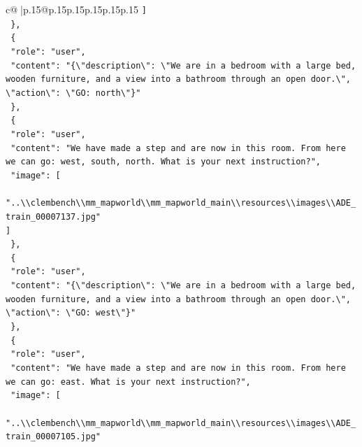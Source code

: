 \documentclass{article}
\begin{document}
{\begin{supertabular}{c@{$\;$}|p{.15\linewidth}@{}p{.15\linewidth}p{.15\linewidth}p{.15\linewidth}p{.15\linewidth}p{.15\linewidth}}
{{{\texttt{    {]}} \\
\texttt{  \},} \\
\texttt{  \{} \\
\texttt{    "role": "user",} \\
\texttt{    "content": "\{\textbackslash{}"description\textbackslash{}": \textbackslash{}"We are in a bedroom with a large bed, wooden furniture, and a view into a bathroom through an open door.\textbackslash{}", \textbackslash{}"action\textbackslash{}": \textbackslash{}"GO: north\textbackslash{}"\}"} \\
\texttt{  \},} \\
\texttt{  \{} \\
\texttt{    "role": "user",} \\
\texttt{    "content": "We have made a step and are now in this room. From here we can go: west, south, north. What is your next instruction?",} \\
\texttt{    "image": {[}} \\
\texttt{      "..\textbackslash{}\textbackslash{}clembench\textbackslash{}\textbackslash{}mm\_mapworld\textbackslash{}\textbackslash{}mm\_mapworld\_main\textbackslash{}\textbackslash{}resources\textbackslash{}\textbackslash{}images\textbackslash{}\textbackslash{}ADE\_train\_00007137.jpg"} \\
\texttt{    {]}} \\
\texttt{  \},} \\
\texttt{  \{} \\
\texttt{    "role": "user",} \\
\texttt{    "content": "\{\textbackslash{}"description\textbackslash{}": \textbackslash{}"We are in a bedroom with a large bed, wooden furniture, and a view into a bathroom through an open door.\textbackslash{}", \textbackslash{}"action\textbackslash{}": \textbackslash{}"GO: west\textbackslash{}"\}"} \\
\texttt{  \},} \\
\texttt{  \{} \\
\texttt{    "role": "user",} \\
\texttt{    "content": "We have made a step and are now in this room. From here we can go: east. What is your next instruction?",} \\
\texttt{    "image": {[}} \\
\texttt{      "..\textbackslash{}\textbackslash{}clembench\textbackslash{}\textbackslash{}mm\_mapworld\textbackslash{}\textbackslash{}mm\_mapworld\_main\textbackslash{}\textbackslash{}resources\textbackslash{}\textbackslash{}images\textbackslash{}\textbackslash{}ADE\_train\_00007105.jpg"} \\
}}}
\end{supertabular}}
\end{document}
